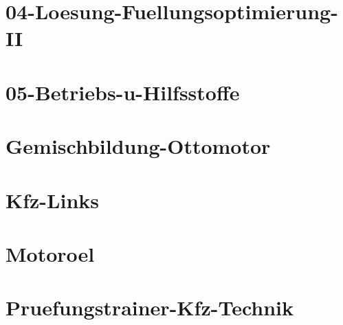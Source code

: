 \chapter{04-Loesung-Fuellungsoptimierung-II}
%
\chapter{05-Betriebs-u-Hilfsstoffe}
%
\chapter{Gemischbildung-Ottomotor}
%
\chapter{Kfz-Links}
%
\chapter{Motoroel}
%
\chapter{Pruefungstrainer-Kfz-Technik}
%



%
%



%




